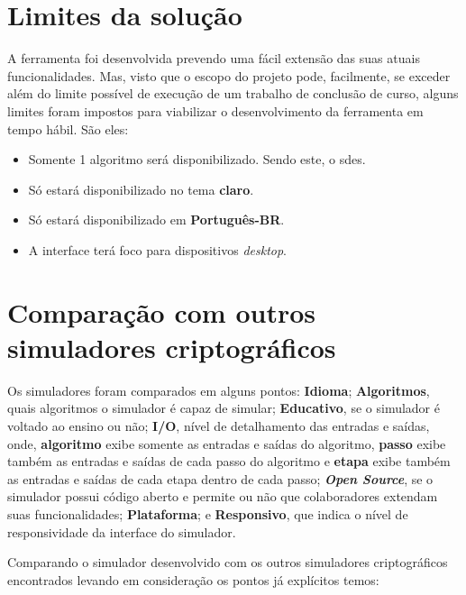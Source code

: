 \section{Limites da solução}
A ferramenta foi desenvolvida prevendo uma fácil extensão das suas atuais funcionalidades. Mas, visto que o escopo do projeto pode, facilmente, se exceder além do limite possível de execução de um trabalho de conclusão de curso, alguns limites foram impostos para viabilizar o desenvolvimento da ferramenta em tempo hábil. São eles:
\begin{itemize}
    \item Somente 1 algoritmo será disponibilizado. Sendo este, o \acrfull{sdes}.
    \item Só estará disponibilizado no tema \textbf{claro}.
    \item Só estará disponibilizado em \textbf{Português-BR}.
    \item A interface terá foco para dispositivos \textit{desktop}.
\end{itemize}

\section{Comparação com outros simuladores criptográficos}
Os simuladores foram comparados em alguns pontos: \textbf{Idioma}; \textbf{Algoritmos}, quais algoritmos o simulador é capaz de simular; \textbf{Educativo}, se o simulador é voltado ao ensino ou não; \textbf{I/O}, nível de detalhamento das entradas e saídas, onde, \textbf{algoritmo} exibe somente as entradas e saídas do algoritmo, \textbf{passo} exibe também as entradas e saídas de cada passo do algoritmo e \textbf{etapa} exibe também as entradas e saídas de cada etapa dentro de cada passo; \textbf{\textit{Open Source}}, se o simulador possui código aberto e permite ou não que colaboradores extendam suas funcionalidades; \textbf{Plataforma}; e \textbf{Responsivo}, que indica o nível de responsividade da interface do simulador.

Comparando o simulador desenvolvido com os outros simuladores criptográficos encontrados levando em consideração os pontos já explícitos temos:

